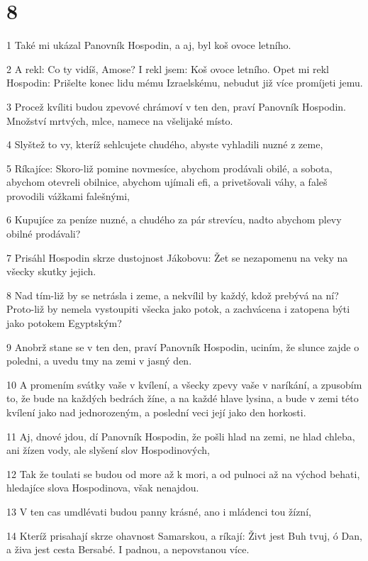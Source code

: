 \chapter{8}

\par 1 Také mi ukázal Panovník Hospodin, a aj, byl koš ovoce letního.
\par 2 A rekl: Co ty vidíš, Amose? I rekl jsem: Koš ovoce letního. Opet mi rekl Hospodin: Prišelte konec lidu mému Izraelskému, nebudut již více promíjeti jemu.
\par 3 Procež kvíliti budou zpevové chrámoví v ten den, praví Panovník Hospodin. Množství mrtvých, mlce, namece na všelijaké místo.
\par 4 Slyštež to vy, kteríž sehlcujete chudého, abyste vyhladili nuzné z zeme,
\par 5 Ríkajíce: Skoro-liž pomine novmesíce, abychom prodávali obilé, a sobota, abychom otevreli obilnice, abychom ujímali efi, a privetšovali váhy, a faleš provodili vážkami falešnými,
\par 6 Kupujíce za peníze nuzné, a chudého za pár strevícu, nadto abychom plevy obilné prodávali?
\par 7 Prisáhl Hospodin skrze dustojnost Jákobovu: Žet se nezapomenu na veky na všecky skutky jejich.
\par 8 Nad tím-liž by se netrásla i zeme, a nekvílil by každý, kdož prebývá na ní? Proto-liž by nemela vystoupiti všecka jako potok, a zachvácena i zatopena býti jako potokem Egyptským?
\par 9 Anobrž stane se v ten den, praví Panovník Hospodin, uciním, že slunce zajde o poledni, a uvedu tmy na zemi v jasný den.
\par 10 A promením svátky vaše v kvílení, a všecky zpevy vaše v naríkání, a zpusobím to, že bude na každých bedrách žíne, a na každé hlave lysina, a bude v zemi této kvílení jako nad jednorozeným, a poslední veci její jako den horkosti.
\par 11 Aj, dnové jdou, dí Panovník Hospodin, že pošli hlad na zemi, ne hlad chleba, ani žízen vody, ale slyšení slov Hospodinových,
\par 12 Tak že toulati se budou od more až k mori, a od pulnoci až na východ behati, hledajíce slova Hospodinova, však nenajdou.
\par 13 V ten cas umdlévati budou panny krásné, ano i mládenci tou žízní,
\par 14 Kteríž prisahají skrze ohavnost Samarskou, a ríkají: Živt jest Buh tvuj, ó Dan, a živa jest cesta Bersabé. I padnou, a nepovstanou více.

